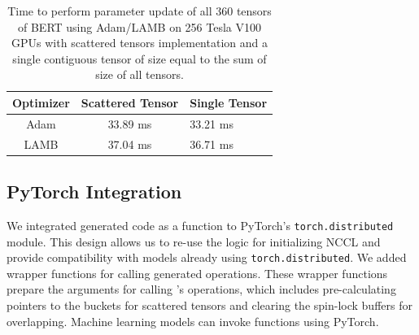 \begin{table}[t]
    \center
  \small
  \caption{Time to perform parameter update of all 360 tensors of BERT using Adam/LAMB on 256 Tesla V100 GPUs with scattered tensors implementation and a single contiguous tensor of size equal to the sum of size of all tensors.\label{tab:scattered-tensors}}
  \begin{tabular}{c|c|l}
  \textbf{Optimizer}   & \textbf{Scattered Tensor} & \textbf{Single Tensor}\\ \hline
  Adam & 33.89 ms & 33.21 ms  \\ 
  LAMB & 37.04 ms & 36.71 ms
  \end{tabular}
  \par \bigskip%
\end{table}

\subsection{PyTorch Integration}
\label{sec:pytorch-integration}
We integrated \tool generated code as a function to PyTorch's \texttt{torch.distributed} module.
This design allows us to re-use the logic for initializing NCCL and provide compatibility with models already using \texttt{torch.distributed}.
We added wrapper functions for calling \tool generated operations.
These wrapper functions prepare the arguments for calling \tool's operations, which includes pre-calculating pointers to the buckets for scattered tensors and clearing the spin-lock buffers for overlapping.
Machine learning models can invoke \tool functions using PyTorch.